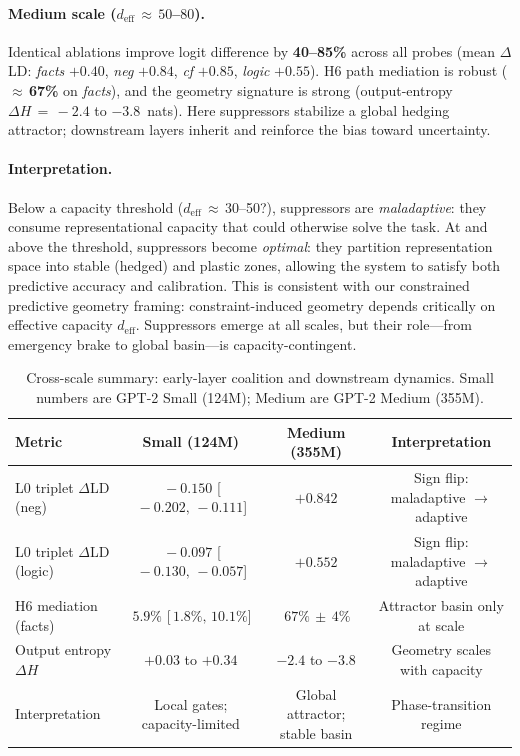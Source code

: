 \paragraph{Medium scale (\texorpdfstring{$d_\text{eff}\,\approx\,50$--$80$}{d_eff ≈ 50–80}).}
Identical ablations improve logit difference by \textbf{40--85\%} across all probes (mean \(\Delta\)LD: \emph{facts} \(+0.40\), \emph{neg} \(+0.84\), \emph{cf} \(+0.85\), \emph{logic} \(+0.55\)).
H6 path mediation is robust (\(\approx\,\)\textbf{67\%} on \emph{facts}), and the geometry signature is strong (output-entropy \(\Delta H\,=\,-2.4\) to \(-3.8\)~nats).
Here suppressors stabilize a global hedging attractor; downstream layers inherit and reinforce the bias toward uncertainty.

\paragraph{Interpretation.}
Below a capacity threshold (\(d_\text{eff}\,\approx\,30\)--50?), suppressors are \emph{maladaptive}: they consume representational capacity that could otherwise solve the task.
At and above the threshold, suppressors become \emph{optimal}: they partition representation space into stable (hedged) and plastic zones, allowing the system to satisfy both predictive accuracy and calibration.
This is consistent with our constrained predictive geometry framing: constraint-induced geometry depends critically on effective capacity \(d_\text{eff}\). Suppressors emerge at all scales, but their role—from emergency brake to global basin—is capacity-contingent.

\begin{table}[t]
  \centering
  \caption{Cross-scale summary: early-layer coalition and downstream dynamics. Small numbers are GPT-2 Small (124M); Medium are GPT-2 Medium (355M).}
  \label{tab:capacity-contingent}
  \begin{tabular}{lccc}
    \toprule
    Metric & Small (124M) & Medium (355M) & Interpretation \\
    \midrule
    L0 triplet \(\Delta\)LD (neg)   & \(\,-0.150\) [\(\,-0.202,\,-0.111\)] & \(+0.842\) & Sign flip: maladaptive \(\to\) adaptive \\
    L0 triplet \(\Delta\)LD (logic) & \(\,-0.097\) [\(\,-0.130,\,-0.057\)] & \(+0.552\) & Sign flip: maladaptive \(\to\) adaptive \\
    H6 mediation (facts)              & \(\,5.9\%\) [\(\,1.8\%,\,10.1\%\)] & \(\,67\%\,\pm\,4\%\) & Attractor basin only at scale \\
    Output entropy \(\Delta H\)     & \(+0.03\) to \(+0.34\) & \(-2.4\) to \(-3.8\) & Geometry scales with capacity \\
    Interpretation                    & Local gates; capacity-limited & Global attractor; stable basin & Phase-transition regime \\
    \bottomrule
  \end{tabular}
\end{table}

